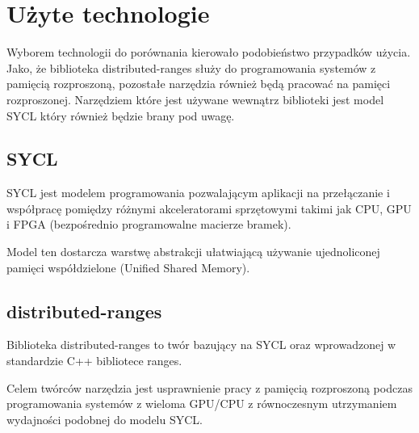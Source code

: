 \documentclass[11pt]{beamer}
\begin{document}
\section{Użyte technologie}
\begin{frame}
	\begin{center}
	\insertsectionhead\par%
	\end{center}
\end{frame}

\begin{frame}{\secname}
Wyborem technologii do porównania kierowało podobieństwo przypadków użycia. Jako, że biblioteka distributed-ranges służy do programowania systemów z pamięcią rozproszoną, pozostałe narzędzia również będą pracować na pamięci rozproszonej. Narzędziem które jest używane wewnątrz biblioteki jest model SYCL który również będzie brany pod uwagę. 
\end{frame}

\subsection{SYCL}
\begin{frame}{\subsecname}
SYCL jest modelem programowania pozwalającym aplikacji na przełączanie i współpracę pomiędzy różnymi akceleratorami sprzętowymi takimi jak CPU, GPU i FPGA (bezpośrednio programowalne macierze bramek).

Model ten dostarcza warstwę abstrakcji ułatwiającą używanie ujednoliconej pamięci współdzielone (Unified Shared Memory).

\end{frame}

\subsection{distributed-ranges}
\begin{frame}{\subsecname}
Biblioteka distributed-ranges to twór bazujący na SYCL  oraz wprowadzonej w standardzie C++ bibliotece ranges.

Celem twórców narzędzia jest usprawnienie pracy z pamięcią rozproszoną podczas programowania systemów z wieloma GPU/CPU z równoczesnym utrzymaniem wydajności podobnej do modelu SYCL.
\end{frame}
\end{document}
